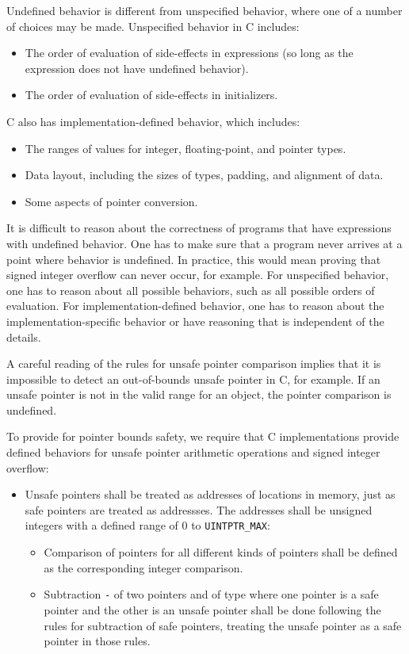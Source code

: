 Undefined behavior is different from unspecified behavior, where one of
a number of choices may be made. Unspecified behavior in C includes:

\begin{itemize}
\item
  The order of evaluation of side-effects in expressions (so long as the
  expression does not have undefined behavior).
\item
  The order of evaluation of side-effects in initializers.
\end{itemize}

C also has implementation-defined behavior, which includes:

\begin{itemize}
\item
  The ranges of values for integer, floating-point, and pointer types.
\item
  Data layout, including the sizes of types, padding, and alignment of
  data.
\item
  Some aspects of pointer conversion.
\end{itemize}

It is difficult to reason about the correctness of programs that have
expressions with undefined behavior. One has to make sure that a program
never arrives at a point where behavior is undefined. In practice, this
would mean proving that signed integer overflow can never occur, for
example. For unspecified behavior, one has to reason about all possible
behaviors, such as all possible orders of evaluation. For
implementation-defined behavior, one has to reason about the
implementation-specific behavior or have reasoning that is independent
of the details.

A careful reading of the rules for unsafe pointer comparison implies
that it is impossible to detect an out-of-bounds unsafe pointer in C,
for example. If an unsafe pointer  is not in the valid range for an
object, the pointer comparison is undefined.

To provide for pointer bounds safety, we require that C implementations
provide defined behaviors for unsafe pointer arithmetic operations and
signed integer overflow:

\begin{itemize}
\item
  Unsafe pointers shall be treated as addresses of locations in memory,
  just as safe pointers are treated as addressses. The addresses shall
  be unsigned integers with a defined range of 0 to
  \texttt{UINTPTR\_MAX}:

  \begin{itemize}
  \item
    Comparison of pointers for all different kinds of pointers shall be
    defined as the corresponding integer comparison.
  \item
    Subtraction  \texttt{-}  of two pointers  and 
    of type  where one
    pointer is a safe pointer and the other is an unsafe pointer shall
    be done following the rules for subtraction of safe pointers,
    treating the unsafe pointer as a safe pointer in those rules.
  \end{itemize}
\end{itemize}

